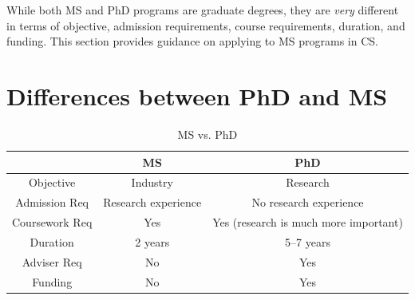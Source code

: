 \documentclass[oneside,11pt,dvipsnames]{book}
\begin{document}
While both MS and PhD programs are graduate degrees, they are \emph{very} different in terms of objective, admission requirements, course requirements, duration, and funding. This section provides guidance on applying to MS programs in CS.

\section{Differences between PhD and MS}


\begin{table}
    \caption{MS vs. PhD}\label{tab:phd-vs-ms}
    \begin{tabular}{c|c|c}
    \toprule
    \textbf{} & \textbf{MS} & \textbf{PhD} \\
    \midrule
    Objective & Industry & Research \\
    Admission Req & Research experience & No research experience \\
    Coursework Req & Yes & Yes (research is much more important)  \\
    Duration & 2 years & 5--7 years \\
    Adviser Req & No & Yes \\
    Funding & No & Yes \\
    \bottomrule
    \end{tabular}
  \end{table}
\end{document}

